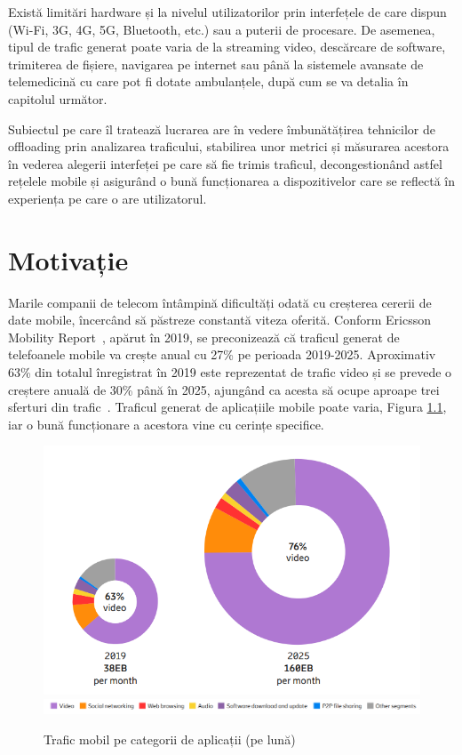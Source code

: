 \documentclass[12pt,a4paper]{report}
\begin{document}
Există limitări hardware și la nivelul utilizatorilor prin interfețele de care dispun (Wi-Fi, 3G, 4G, 5G, Bluetooth, etc.) sau a puterii de procesare. De asemenea, tipul de trafic generat poate varia de la streaming video, descărcare de software, trimiterea de fișiere, navigarea pe internet sau până la sistemele avansate de telemedicină cu care pot fi dotate ambulanțele, după cum se va detalia în capitolul următor.

Subiectul pe care îl tratează lucrarea are în vedere îmbunătățirea tehnicilor de offloading prin analizarea traficului, stabilirea unor metrici și măsurarea acestora în vederea alegerii interfeței pe care să fie trimis traficul, decongestionând astfel rețelele mobile și asigurând o bună funcționarea a dispozitivelor care se reflectă în experiența pe care o are utilizatorul.

\chapter{Motivație}
Marile companii de telecom întâmpină dificultăți odată cu creșterea cererii de date mobile, încercând să păstreze constantă viteza oferită. Conform Ericsson Mobility Report~\cite{ericsson_mobility_report}, apărut în 2019, se preconizează că traficul generat de telefoanele mobile va crește anual cu 27\% pe perioada 2019-2025. Aproximativ 63\% din totalul înregistrat în 2019 este reprezentat de trafic video și se prevede o creștere anuală de 30\% până în 2025, ajungând ca acesta să ocupe aproape trei sferturi din trafic~\cite{ericsson_mobility_report}. Traficul generat de aplicațiile mobile poate varia, Figura \ref{fig:tipuri_de_trafic}, iar o bună funcționare a acestora vine cu cerințe specifice.

\begin{figure}[th]
\centering
\includegraphics[width=\linewidth]{img/tipuri_de_trafic.png}
\includegraphics[width=\linewidth]{img/tipuri_de_trafic_legenda.png}
\caption{Trafic mobil pe categorii de aplicații (pe lună)~\cite{ericsson_mobility_report}\protect}
\label{fig:tipuri_de_trafic}
\end{figure}
\end{document}
